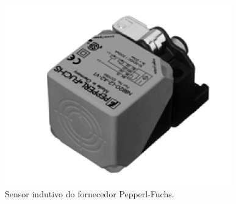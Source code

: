 \begin{figure}[H]
    \centering
    \includegraphics[width=0.4\columnwidth]{figs/indutivo/1.png}
    \caption{Sensor indutivo do fornecedor Pepperl-Fuchs.}
    \label{indutivo_1}
\end{figure}